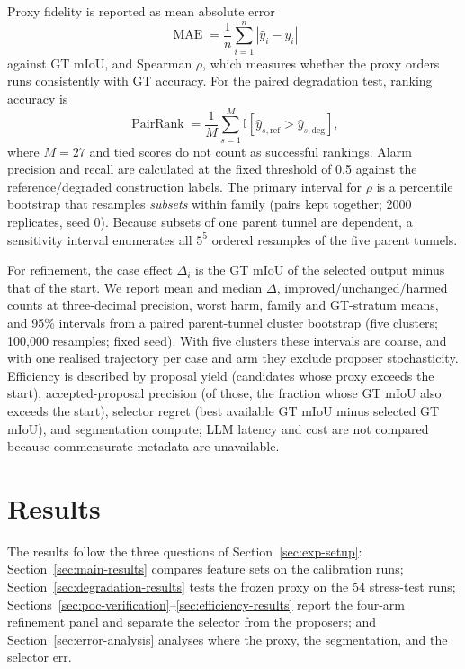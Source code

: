 \documentclass[a4paper,fleqn]{cas-dc}
\begin{document}
Proxy fidelity is reported as mean absolute error
\begin{equation}
\operatorname{MAE}
=
\frac{1}{n}\sum_{i=1}^{n}
|\hat{y}_i-y_i|
\end{equation}
against GT mIoU, and Spearman $\rho$, which measures whether the proxy orders runs consistently with GT accuracy. For the paired degradation test, ranking accuracy is
\begin{equation}
\operatorname{PairRank}
=
\frac{1}{M}\sum_{s=1}^{M}
\mathbb{I}
\left[
\hat{y}_{s,\mathrm{ref}}>
\hat{y}_{s,\mathrm{deg}}
\right],
\end{equation}
where $M=27$ and tied scores do not count as successful rankings. Alarm precision and recall are calculated at the fixed threshold of 0.5 against the reference/degraded construction labels. The primary interval for $\rho$ is a percentile bootstrap that resamples \emph{subsets} within family (pairs kept together; 2000 replicates, seed 0). Because subsets of one parent tunnel are dependent, a sensitivity interval enumerates all $5^5$ ordered resamples of the five parent tunnels.

For refinement, the case effect $\Delta_i$ is the GT mIoU of the selected output minus that of the start. We report mean and median $\Delta$, improved/unchanged/harmed counts at three-decimal precision, worst harm, family and GT-stratum means, and 95\% intervals from a paired parent-tunnel cluster bootstrap (five clusters; 100{,}000 resamples; fixed seed). With five clusters these intervals are coarse, and with one realised trajectory per case and arm they exclude proposer stochasticity. Efficiency is described by proposal yield (candidates whose proxy exceeds the start), accepted-proposal precision (of those, the fraction whose GT mIoU also exceeds the start), selector regret (best available GT mIoU minus selected GT mIoU), and segmentation compute; LLM latency and cost are not compared because commensurate metadata are unavailable.

\section{Results}\label{sec:results}

The results follow the three questions of Section~\ref{sec:exp-setup}: Section~\ref{sec:main-results} compares feature sets on the calibration runs; Section~\ref{sec:degradation-results} tests the frozen proxy on the 54 stress-test runs; Sections~\ref{sec:poc-verification}--\ref{sec:efficiency-results} report the four-arm refinement panel and separate the selector from the proposers; and Section~\ref{sec:error-analysis} analyses where the proxy, the segmentation, and the selector err.
\end{document}
